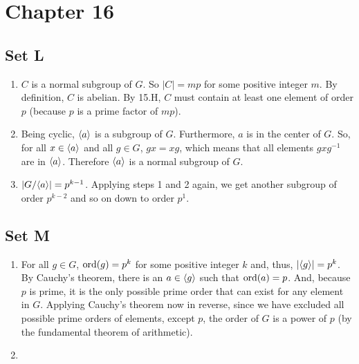 \section{Chapter 16}
\subsection{Set L}
\begin{enumerate}
    \item $C$ is a normal subgroup of $G$. So $|C| = mp$ for some positive integer $m$. By definition, $C$ is abelian. By 15.H, $C$ must contain at least one element of order $p$ (because $p$ is a prime factor of $mp$).
    \item Being cyclic, $\langle a\rangle$ is a subgroup of $G$. Furthermore, $a$ is in the center of $G$. So, for all $x \in \langle a\rangle$ and all $g \in G$, $gx = xg$, which means that all elements $gxg^{-1}$ are in $\langle a\rangle$.  Therefore $\langle a\rangle$ is a normal subgroup of $G$.
    \item $|G/\langle a\rangle| = p^{k - 1}$. Applying steps 1 and 2 again, we get another subgroup of order $p^{k - 2}$ and so on down to order $p^1$.
\end{enumerate}

\subsection{Set M}
\begin{enumerate}
    \item For all $g \in G$, $\operatorname{ord}(g) = p^k$ for some positive integer $k$ and, thus, $|\langle g\rangle| = p^k$. By Cauchy's theorem, there is an $a \in \langle g\rangle$ such that $\operatorname{ord}(a) = p$. And, because $p$ is prime, it is the only possible prime order that can exist for any element in $G$. Applying Cauchy's theorem now in reverse, since we have excluded all possible prime orders of elements, except $p$, the order of $G$ is a power of $p$ (by the fundamental theorem of arithmetic).
    
    \item 
\end{enumerate}